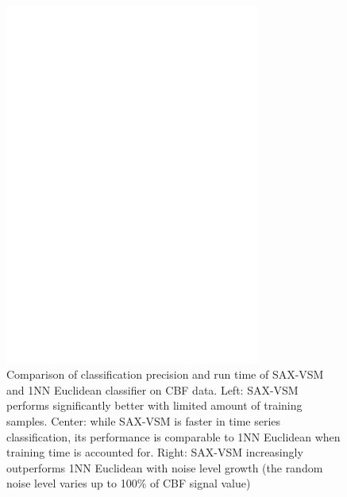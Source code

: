 \documentclass[conference]{IEEEtran}
\begin{document}
\begin{figure}[t]
   \centering
   \includegraphics[width=84mm]{figures/precision-runtime_new.ps}
   \caption{Comparison of classification precision and run time of SAX-VSM and 1NN 
   Euclidean classifier on CBF data. 
   Left: SAX-VSM performs significantly better with limited amount of training samples. 
   Center: while SAX-VSM is faster in time series classification, its performance 
   is comparable to 1NN Euclidean when training time is accounted for.
   Right: SAX-VSM increasingly outperforms 1NN Euclidean with noise level growth 
   (the random noise level varies up to 100\% of CBF signal value)
   }
   \label{fig:precision-runtime}
   \vspace{-0.1cm}
\end{figure}

\end{document}
